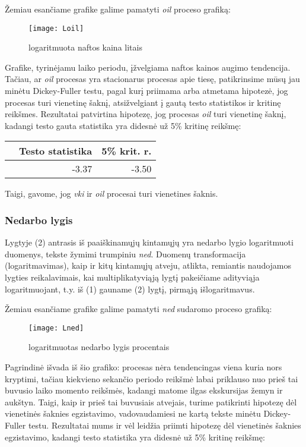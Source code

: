 \documentclass[a4paper]{article}
\begin{document}
Žemiau esančiame grafike galime pamatyti \textit{oil} proceso grafiką:

\begin{figure}[!h]
\centering
\texttt{[image: Loil]}
\caption{logaritmuota naftos kaina litais}
\end{figure}

\indent Grafike, tyrinėjamu laiko periodu, įžvelgiama naftos kainos augimo tendencija. Tačiau, ar \textit{oil} procesas yra stacionarus procesas apie tiesę, patikrinsime mūsų jau minėtu Dickey-Fuller testu, pagal kurį priimama arba atmetama hipotezė, jog procesas turi vienetinę šaknį, atsižvelgiant į gautą testo statistikos ir kritinę reikšmes. Rezultatai patvirtina hipotezę, jog procesas \textit{oil} turi vienetinę šaknį, kadangi testo gauta statistika yra didesnė už 5\% kritinę reikšmę:

\begin{table}[!h]
\begin{center}
\begin{tabular}{rrr}
  \hline
 & Testo statistika & 5\% krit. r. \\ 
  \hline
 & -3.37 & -3.50 \\ 
   \hline
\end{tabular}
\end{center}
\end{table}

\indent Taigi, gavome, jog \textit{vki} ir \textit{oil} procesai turi vienetines šaknis.
		
\newpage \subsubsection{Nedarbo lygis} \indent

Lygtyje (2) antrasis iš paaiškinamųjų kintamųjų yra nedarbo lygio logaritmuoti duomenys, tekste žymimi trumpiniu \textit{ned}. Duomenų transformacija (logaritmavimas), kaip ir kitų kintamųjų atveju, atlikta, remiantis naudojamos lygties reikalavimais, kai multiplikatyviąją lygtį pakeičiame adityviąja logaritmuojant, t.y. iš (1) gauname (2) lygtį, pirmąją išlogaritmavus.

Žemiau esančiame grafike galime pamatyti \textit{ned} sudaromo proceso grafiką:

\begin{figure}[!h]
\centering
\texttt{[image: Lned]}
\caption{logaritmuotas nedarbo lygis procentais}
\end{figure}

\indent Pagrindinė išvada iš šio grafiko: procesas nėra tendencingas viena kuria nors kryptimi, tačiau kiekvieno sekančio periodo reikšmė labai priklauso nuo prieš tai buvusio laiko momento reikšmės, kadangi matome ilgas ekskursijas žemyn ir aukštyn. Taigi, kaip ir prieš tai buvusiais atvejais, turime patikrinti hipotezę dėl vienetinės šaknies egzistavimo, vadovaudamiesi ne kartą tekste minėtu Dickey-Fuller testu. Rezultatai mums ir vėl leidžia priimti hipotezę dėl vienetinės šaknies egzistavimo, kadangi testo statistika yra didesnė už 5\% kritinę reikšmę:
\end{document}
